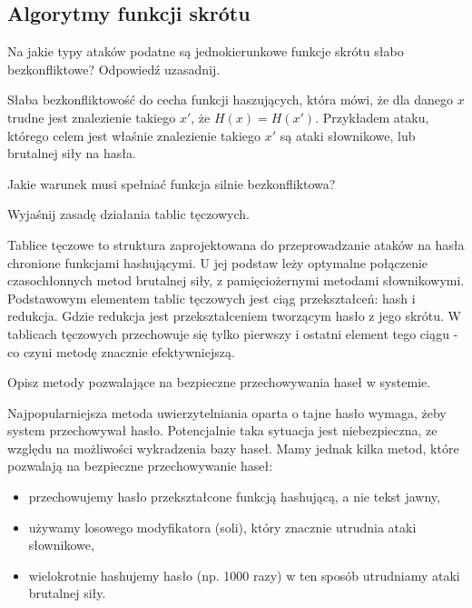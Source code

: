 \documentclass[answers,11pt]{exam}
\begin{document}
\subsection{Algorytmy funkcji skrótu}
\begin{questions}

\question Na jakie typy ataków podatne są jednokierunkowe funkcje skrótu słabo bezkonfliktowe? Odpowiedź uzasadnij.
\begin{solution}
Słaba bezkonfliktowość do cecha funkcji haszujących, która mówi, że dla danego $x$ trudne jest znalezienie takiego $x'$, że $H(x) = H(x')$.
Przykładem ataku, którego celem jest właśnie znalezienie takiego $x'$ są ataki słownikowe, lub brutalnej siły na hasła.
\end{solution}

\question Jakie warunek musi spełniać funkcja silnie bezkonfliktowa?


\question Wyjaśnij zasadę działania tablic tęczowych.
\begin{solution}
Tablice tęczowe to struktura zaprojektowana do przeprowadzanie ataków na hasła chronione funkcjami hashującymi. U jej podstaw leży optymalne połączenie czasochłonnych metod brutalnej siły, z pamięciożernymi metodami słownikowymi. Podstawowym elementem tablic tęczowych jest ciąg przekształceń: hash i redukcja. Gdzie redukcja jest przekształceniem tworzącym hasło z jego skrótu. W tablicach tęczowych przechowuje się tylko pierwszy i ostatni element tego ciągu - co czyni metodę znacznie efektywniejszą.
\end{solution}

\question Opisz metody pozwalające na bezpieczne przechowywania haseł w systemie.
\begin{solution}
Najpopularniejsza metoda uwierzytelniania oparta o tajne hasło wymaga, żeby system przechowywał hasło. Potencjalnie taka sytuacja jest niebezpieczna, ze względu na możliwości wykradzenia bazy haseł. Mamy jednak kilka metod, które pozwalają na bezpieczne przechowywanie haseł:
\begin{itemize}
\item przechowujemy hasło przekształcone funkcją hashującą, a nie tekst jawny,
\item używamy losowego modyfikatora (soli), który znacznie utrudnia ataki słownikowe,
\item wielokrotnie hashujemy hasło (np. 1000 razy) w ten sposób utrudniamy ataki brutalnej siły.
\end{itemize}
\end{solution}


\end{questions}
\end{document}
